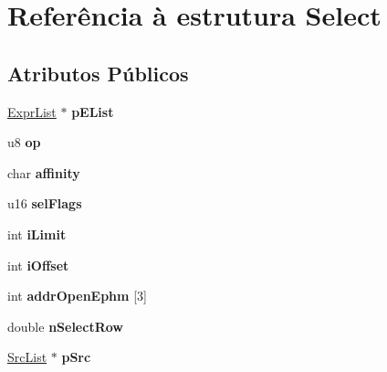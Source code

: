 \hypertarget{struct_select}{\section{Referência à estrutura Select}
\label{struct_select}
}
\subsection*{Atributos Públicos}
\begin{DoxyCompactItemize}
\item 
\hypertarget{struct_select_acf92c5d6b0e0e6a3263a77696baaadc8}{\hyperlink{struct_expr_list}{Expr\-List} $\ast$ {\bfseries p\-E\-List}}\label{struct_select_acf92c5d6b0e0e6a3263a77696baaadc8}

\item 
\hypertarget{struct_select_a84506d61248313b5e10f7891cb7482be}{u8 {\bfseries op}}\label{struct_select_a84506d61248313b5e10f7891cb7482be}

\item 
\hypertarget{struct_select_a92417c2f75c710d2a7919b0d2e0b1d72}{char {\bfseries affinity}}\label{struct_select_a92417c2f75c710d2a7919b0d2e0b1d72}

\item 
\hypertarget{struct_select_a1c445561ea66d48573c8d8751108c743}{u16 {\bfseries sel\-Flags}}\label{struct_select_a1c445561ea66d48573c8d8751108c743}

\item 
\hypertarget{struct_select_abf68908bf029af42a32c60a2558a8b1e}{int {\bfseries i\-Limit}}\label{struct_select_abf68908bf029af42a32c60a2558a8b1e}

\item 
\hypertarget{struct_select_ac12bebd00ed988df3ad1efb8e6c63fe4}{int {\bfseries i\-Offset}}\label{struct_select_ac12bebd00ed988df3ad1efb8e6c63fe4}

\item 
\hypertarget{struct_select_a5cad3b59bf1803be552d002e74bdfd47}{int {\bfseries addr\-Open\-Ephm} \mbox{[}3\mbox{]}}\label{struct_select_a5cad3b59bf1803be552d002e74bdfd47}

\item 
\hypertarget{struct_select_a177125317478139f9ce834e4f7a93c52}{double {\bfseries n\-Select\-Row}}\label{struct_select_a177125317478139f9ce834e4f7a93c52}

\item 
\hypertarget{struct_select_a4e3b9b176a8e1b4af988405ff1f090db}{\hyperlink{struct_src_list}{Src\-List} $\ast$ {\bfseries p\-Src}}\label{struct_select_a4e3b9b176a8e1b4af988405ff1f090db}


\end{DoxyCompactItemize}
